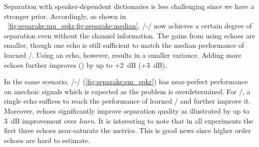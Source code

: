 \mynewline
Separation with speaker-dependent dictionaries is less challenging since we have a stronger prior.
Accordingly, as shown in ~\cref{fig:separake:mu_spkr,fig:separake:median}, \MU/-\NMF/ now achieves a certain degree of separation even without the channel information.
The gains from using echoes are smaller, though one echo is still sufficient to match the median performance of learned \RTFs/.
Using an echo, however, results in a smaller variance.
Adding more echoes further improves \SDR{} (\SIR) by up to +2~dB (+3~dB).

\mynewline
In the same scenario, \EM/-\NMF/ (\cref{fig:separake:em_spkr}) has near-perfect performance on anechoic signals which is expected as the problem is overdetermined.
For \MU/, a single echo suffices to reach the performance of learned \RTFs/ and further improve it.
Moreover, echoes significantly improve separation quality as illustrated by up to 3~dB improvement over \textit{learn}.
It is interesting to note that in all experiments the first three echoes near-saturate the metrics.
This is good news since higher order echoes are hard to estimate.

